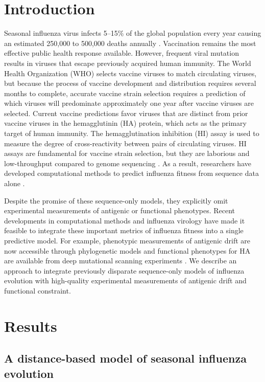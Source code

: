 
\section*{Introduction}

Seasonal influenza virus infects 5--15\% of the global population every year causing an estimated 250,000 to 500,000 deaths annually \cite{flufactsheet}.
Vaccination remains the most effective public health response available.
However, frequent viral mutation results in viruses that escape previously acquired human immunity.
The World Health Organization (WHO) selects vaccine viruses to match circulating viruses, but because the process of vaccine development and distribution requires several months to complete, accurate vaccine strain selection requires a prediction of which viruses will predominate approximately one year after vaccine viruses are selected.
Current vaccine predictions favor viruses that are distinct from prior vaccine viruses in the hemagglutinin (HA) protein, which acts as the primary target of human immunity.
The hemagglutination inhibition (HI) assay \cite{hirst1943studies} is used to measure the degree of cross-reactivity between pairs of circulating viruses.
HI assays are fundamental for vaccine strain selection, but they are laborious and low-throughput compared to genome sequencing \cite{Wood:2012ii}.
As a result, researchers have developed computational methods to predict influenza fitness from sequence data alone \cite{Luksza:2014hj,Steinbruck:2014kq,Neher:2014eu}.

Despite the promise of these sequence-only models, they explicitly omit experimental measurements of antigenic or functional phenotypes.
Recent developments in computational methods and influenza virology have made it feasible to integrate these important metrics of influenza fitness into a single predictive model.
For example, phenotypic measurements of antigenic drift are now accessible through phylogenetic models \cite{Neher:2016hy} and functional phenotypes for HA are available from deep mutational scanning experiments \cite{Lee2018}.
We describe an approach to integrate previously disparate sequence-only models of influenza evolution with high-quality experimental measurements of antigenic drift and functional constraint.

\section*{Results}

\subsection*{A distance-based model of seasonal influenza evolution}

